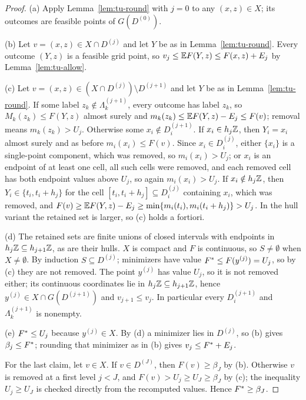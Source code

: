 \begin{proof}
(a) Apply Lemma~\ref{lem:tu-round} with $j=0$ to any $(x,z)\in X$; its
outcomes are feasible points of $G(D^{(0)})$.

(b) Let $v=(x,z)\in X\cap D^{(j)}$ and let $Y$ be as in
Lemma~\ref{lem:tu-round}. Every outcome $(Y,z)$ is a feasible grid point, so
$v_j\le\mathbb E F(Y,z)\le F(x,z)+E_j$ by Lemma~\ref{lem:tu-allow}.

(c) Let $v=(x,z)\in(X\cap D^{(j)})\setminus D^{(j+1)}$ and let $Y$ be as in
Lemma~\ref{lem:tu-round}. If some label $z_k\notin\Lambda^{(j+1)}_k$, every
outcome has label $z_k$, so $M_k(z_k)\le F(Y,z)$ almost surely and
$m_k(z_k)\le\mathbb E F(Y,z)-E_j\le F(v)$; removal means $m_k(z_k)>U_j$. Otherwise
some $x_i\notin D^{(j+1)}_i$. If $x_i\in h_j\mathbb Z$, then $Y_i=x_i$ almost surely
and as before $m_i(x_i)\le F(v)$. Since $x_i\in D^{(j)}_i$, either $\{x_i\}$ is a
single-point component, which was removed, so $m_i(x_i)>U_j$; or $x_i$ is an
endpoint of at least one cell, all such cells were removed, and each removed
cell has both endpoint values above $U_j$, so again $m_i(x_i)>U_j$. If
$x_i\notin h_j\mathbb Z$, then $Y_i\in\{t_i,t_i+h_j\}$ for the cell
$[t_i,t_i+h_j]\subseteq D^{(j)}_i$ containing $x_i$, which was removed, and
$F(v)\ge\mathbb E F(Y,z)-E_j\ge\min\{m_i(t_i),m_i(t_i+h_j)\}>U_j$. In the hull variant
the retained set is larger, so (c) holds a fortiori.

(d) The retained sets are finite unions of closed intervals with endpoints in
$h_j\mathbb Z\subseteq h_{j+1}\mathbb Z$, as are their hulls. $X$ is compact and $F$ is
continuous, so $S\ne\emptyset$ when $X\ne\emptyset$. By induction
$S\subseteq D^{(j)}$; minimizers have value $F^*\le F(y^{(j)})=U_j$, so by
(c) they are not removed. The point $y^{(j)}$ has value $U_j$, so it is not
removed either; its continuous coordinates lie in $h_j\mathbb Z\subseteq h_{j+1}\mathbb Z$,
hence $y^{(j)}\in X\cap G(D^{(j+1)})$ and $v_{j+1}\le v_j$. In particular
every $D^{(j+1)}_i$ and $\Lambda^{(j+1)}_k$ is nonempty.

(e) $F^*\le U_j$ because $y^{(j)}\in X$. By (d) a minimizer lies in
$D^{(j)}$, so (b) gives $\beta_j\le F^*$; rounding that minimizer as in (b)
gives $v_j\le F^*+E_j$.

For the last claim, let $v\in X$. If $v\in D^{(J)}$, then $F(v)\ge\beta_J$ by
(b). Otherwise $v$ is removed at a first level $j<J$, and
$F(v)>U_j\ge U_J\ge\beta_J$ by (c); the inequality $U_j\ge U_J$ is checked
directly from the recomputed values. Hence $F^*\ge\beta_J$.
\end{proof}

